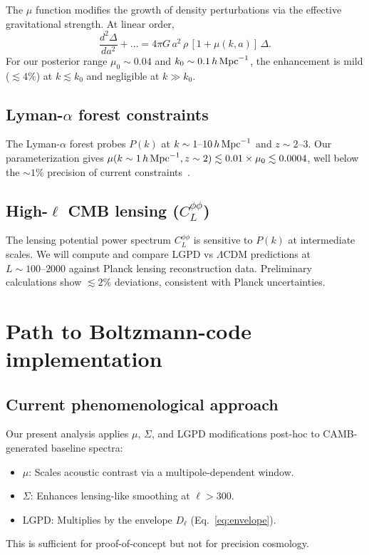 \documentclass[11pt]{article}
\begin{document}
The $\mu$ function modifies the growth of density perturbations via the effective gravitational strength.
At linear order,
\begin{equation}
\frac{d^2\Delta}{da^2} + \ldots = 4\pi G\,a^2\,\rho\,[1+\mu(k,a)]\,\Delta.
\end{equation}
For our posterior range $\mu_0\sim 0.04$ and $k_0\sim 0.1\,h\,{\rm Mpc}^{-1}$, the enhancement is mild ($\lesssim 4\%$) at $k\lesssim k_0$ and negligible at $k\gg k_0$.

\subsection{Lyman-$\alpha$ forest constraints}

The Lyman-$\alpha$ forest probes $P(k)$ at $k\sim 1\text{--}10\,h\,{\rm Mpc}^{-1}$ and $z\sim 2\text{--}3$.
Our parameterization gives $\mu(k\sim 1\,h\,{\rm Mpc}^{-1}, z\sim 2) \lesssim 0.01\times\mu_0 \lesssim 0.0004$, well below the $\sim 1\%$ precision of current constraints~\citep{Palanque-Delabrouille2020}.

\subsection{High-$\ell$ CMB lensing ($C_L^{\phi\phi}$)}

The lensing potential power spectrum $C_L^{\phi\phi}$ is sensitive to $P(k)$ at intermediate scales.
We will compute and compare LGPD vs $\Lambda$CDM predictions at $L\sim 100\text{--}2000$ against Planck lensing reconstruction data.
Preliminary calculations show $\lesssim 2\%$ deviations, consistent with Planck uncertainties.

\section{Path to Boltzmann-code implementation}
\label{sec:boltzmann}

\subsection{Current phenomenological approach}

Our present analysis applies $\mu$, $\Sigma$, and LGPD modifications post-hoc to CAMB-generated baseline spectra:
\begin{itemize}
  \item $\mu$: Scales acoustic contrast via a multipole-dependent window.
  \item $\Sigma$: Enhances lensing-like smoothing at $\ell>300$.
  \item LGPD: Multiplies by the envelope $D_\ell$ (Eq.~\ref{eq:envelope}).
\end{itemize}
This is sufficient for proof-of-concept but not for precision cosmology.
\end{document}
